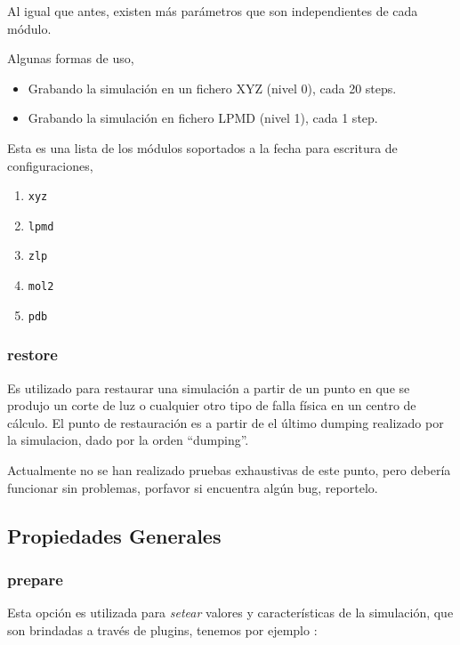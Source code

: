 Al igual que antes, existen m\'as par\'ametros que son independientes de cada m\'odulo.

Algunas formas de uso,

\begin{itemize}
 \item Grabando la simulaci\'on en un fichero XYZ (nivel 0), cada 20 steps.
 \item Grabando la simulaci\'on en fichero LPMD (nivel 1), cada 1 step.
\end{itemize}

Esta es una lista de los m\'odulos soportados a la fecha para escritura de configuraciones,

\begin{enumerate}
 \item \verb|xyz|
 \item \verb|lpmd|
 \item \verb|zlp|
 \item \verb|mol2|
 \item \verb|pdb|
\end{enumerate}


\subsubsection{restore}

Es utilizado para restaurar una simulaci\'on a partir de un punto en que se produjo un corte de luz o cualquier otro tipo de falla f\'isica en un centro de c\'alculo. El punto de restauraci\'on es a partir de el \'ultimo dumping realizado por la simulacion, dado por la orden ``dumping''.

Actualmente no se han realizado pruebas exhaustivas de este punto, pero deber\'ia funcionar sin problemas, porfavor si encuentra alg\'un bug, reportelo.

\subsection{Propiedades Generales}
\subsubsection{prepare}
Esta opci\'on es utilizada para \textit{setear} valores y caracter\'isticas de la simulaci\'on, que son brindadas a trav\'es de plugins, tenemos por ejemplo :

